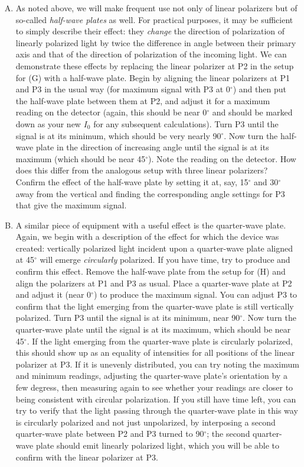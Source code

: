 \begin{enumerate}[(A)]
\item As noted above, we will make frequent use not only of linear polarizers but of so-called \emph{half-wave plates} as well. For practical purposes, it may be sufficient to simply describe their effect: they \emph{change} the direction of polarization of linearly polarized light by twice the difference in angle between their primary axis and that of the direction of polarization of the incoming light. We can demonstrate these effects by replacing the linear polarizer at P2 in the setup for (G) with a half-wave plate. Begin by aligning the linear polarizers at P1 and P3 in the usual way (for maximum signal with P3 at 0$^\circ$) and then put the half-wave plate between them at P2, and adjust it for a maximum reading on the detector (again, this should be near 0$^\circ$ and should be marked down as your new $I_0$ for any subsequent calculations). Turn P3 until the signal is at its minimum, which should be very nearly 90$^\circ$. Now turn the half-wave plate in the direction of increasing angle until the signal is at its maximum (which should be near 45$^\circ$). Note the reading on the detector. How does this differ from the analogous setup with three linear polarizers? Confirm the effect of the half-wave plate by setting it at, say, 15$^\circ$ and 30$^\circ$ away from the vertical and finding the corresponding angle settings for P3 that give the maximum signal.

\item A similar piece of equipment with a useful effect is the quarter-wave plate. Again, we begin with a description of the effect for which the device was created: vertically polarized light incident upon a quarter-wave plate aligned at 45$^\circ$ will emerge \emph{circularly} polarized. If you have time, try to produce and confirm this effect. Remove the half-wave plate from the setup for (H) and align the polarizers at P1 and P3 as usual. Place a quarter-wave plate at P2 and adjust it (near 0$^\circ$) to produce the maximum signal. You can adjust P3 to confirm that the light emerging from the quarter-wave plate is still vertically polarized. Turn P3 until the signal is at its minimum, near 90$^\circ$. Now turn the quarter-wave plate until the signal is at its maximum, which should be near 45$^\circ$. If the light emerging from the quarter-wave plate is circularly polarized, this should show up as an equality of intensities for all positions of the linear polarizer at P3. If it is unevenly distributed, you can try noting the maximum and minimum readings, adjusting the quarter-wave plate's orientation by a few degress, then measuring again to see whether your readings are closer to being consistent with circular polarization. If you still have time left, you can try to verify that the light passing through the quarter-wave plate in this way is circularly polarized and not just unpolarized, by interposing a second quarter-wave plate between P2 and P3 turned to 90$^\circ$; the second quarter-wave plate should emit linearly polarized light, which you will be able to confirm with the linear polarizer at P3.

\end{enumerate}

